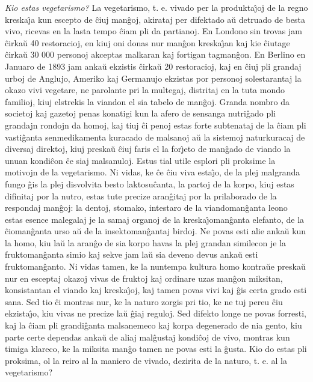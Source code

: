 \emph{Kio estas vegetarismo?} La vegetarismo, t. e. vivado per la
produkta\^{\j}oj de la regno kreska\^{\j}a kun escepto de \^ciuj
man\^goj, akirataj per difektado a\u u detruado de besta vivo,
ricevas en la lasta tempo \^ciam pli da partianoj. En Londono sin
trovas jam \^cirka\u u 40 restoracioj, en kiuj oni donas nur
man\^gon kreska\^{\j}an kaj kie \^ciutage \^cirka\u u 30 000
personoj akceptas malkaran kaj fortigan tagman\^gon. En Berlino en
Januaro de 1893 jam anka\u u ekzistis \^cirka\u u 20 restoracioj,
kaj en \^ciuj pli grandaj urboj de Anglujo, Ameriko kaj Germanujo
ekzistas por personoj solestarantaj la okazo vivi vegetare, ne
parolante pri la multegaj, distritaj en la tuta mondo familioj, kiuj
elstrekis la viandon el sia tabelo de man\^goj. Granda nombro da
societoj kaj gazetoj penas konatigi kun la afero de sensanga
nutri\^gado pli grandajn rondojn da homoj, kaj tiuj \^ci penoj estas
forte subtenataj de la \^ciam pli vasti\^ganta senmedikamenta
kuracado de malsanoj a\u u la sistemoj naturkuracaj de diversaj
direktoj, kiuj preska\u u \^ciuj faris el la for\^{\j}eto de
man\^gado de viando la unuan kondi\^con \^ce siaj malsanuloj. Estus
tial utile esplori pli proksime la motivojn de la vegetarismo. Ni
vidas, ke \^ce \^ciu viva esta\^{\j}o, de la plej malgranda fungo
\^gis la plej disvolvita besto laktosu\^canta, la partoj de la
korpo, kiuj estas difinitaj por la nutro, estas tute precize
aran\^gitaj por la prilaborado de la respondaj man\^goj: la dentoj,
stomako, intestaro de la viandoman\^ganta leono estas esence
malegalaj je la samaj organoj de la kreska\^{\j}oman\^ganta
elefanto, de la \^cioman\^ganta urso a\u u de la insektoman\^gantaj
birdoj. Ne povas esti alie anka\u u kun la homo, kiu la\u u la
aran\^go de sia korpo havas la plej grandan similecon je la
fruktoman\^ganta simio kaj sekve jam la\u u sia deveno devus anka\u
u esti fruktoman\^ganto. Ni vidas tamen, ke la nuntempa kultura homo
kontra\u ue preska\u u nur en esceptaj okazoj vivas de fruktoj kaj
ordinare uzas man\^gon miksitan, konsistantan el viando kaj
kreska\^{\j}oj, kaj tamen povas vivi kaj \^gis certa grado esti
sana. Sed tio \^ci montras nur, ke la naturo zorgis pri tio, ke ne
tuj pereu \^ciu ekzista\^{\j}o, kiu vivas ne precize la\u u \^giaj
reguloj. Sed difekto longe ne povas forresti, kaj la \^ciam pli
grandi\^ganta malsanemeco kaj korpa degenerado de nia gento, kiu
parte certe dependas anka\u u de aliaj mal\^gustaj kondi\^coj de
vivo, montras kun timiga klareco, ke la miksita man\^go tamen ne
povas esti la \^gusta. Kio do estas pli proksima, ol la reiro al la
maniero de vivado, dezirita de la naturo, t. e. al la vegetarismo?
